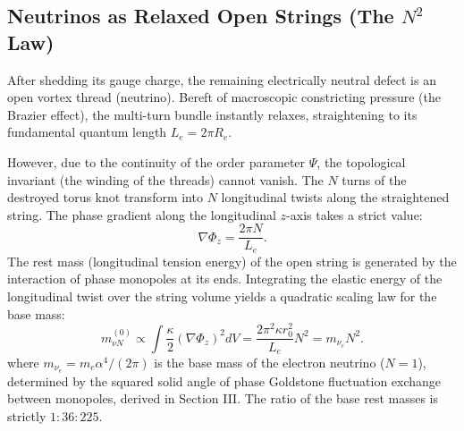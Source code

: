 \documentclass[12pt,a4paper]{article}
\begin{document}
\subsection{Neutrinos as Relaxed Open Strings (The $N^2$ Law)}
After shedding its gauge charge, the remaining electrically neutral defect is an open vortex thread (neutrino). Bereft of macroscopic constricting pressure (the Brazier effect), the multi-turn bundle instantly relaxes, straightening to its fundamental quantum length $L_e = 2\pi R_e$.

However, due to the continuity of the order parameter $\Psi$, the topological invariant (the winding of the threads) cannot vanish. The $N$ turns of the destroyed torus knot transform into $N$ longitudinal twists along the straightened string. The phase gradient along the longitudinal $z$-axis takes a strict value:
\begin{equation}
	\nabla \Phi_z = \frac{2\pi N}{L_e}.
\end{equation}
The rest mass (longitudinal tension energy) of the open string is generated by the interaction of phase monopoles at its ends. Integrating the elastic energy of the longitudinal twist over the string volume yields a quadratic scaling law for the base mass:
\begin{equation}
	m_{\nu N}^{(0)} \propto \int \frac{\kappa}{2} (\nabla \Phi_z)^2 dV = \frac{2\pi^2 \kappa r_0^2}{L_e} N^2 = m_{\nu_e} N^2.
\end{equation}
where $m_{\nu_e} = m_e \alpha^4 / (2\pi)$ is the base mass of the electron neutrino ($N=1$), determined by the squared solid angle of phase Goldstone fluctuation exchange between monopoles, derived in Section III. The ratio of the base rest masses is strictly $1 : 36 : 225$.
\end{document}
